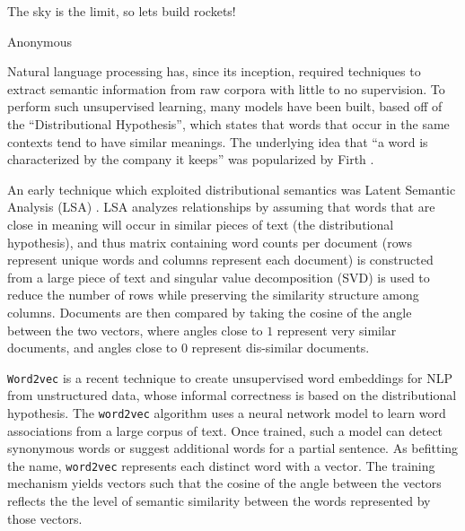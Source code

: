 \documentclass[11pt]{book}
\newcommand{\citep}[1]{\cite{#1}}
\begin{document}
\epigraph{The sky is the limit, so lets build rockets!}{Anonymous}


Natural language processing has, since its inception, required
techniques to extract semantic information from raw corpora with little to no
supervision. To perform such unsupervised learning, many models
have been built, based off of the ``Distributional Hypothesis'', which states
that words that occur in the same contexts tend to have similar meanings.
The
underlying idea that ``a word is characterized by the company it keeps'' was
popularized by Firth \citep{firth1957synopsis}.

An early technique which exploited distributional semantics was Latent Semantic
Analysis (LSA) \cite{landauer1998introduction}. LSA analyzes relationships by
assuming that words that are close in meaning will occur in similar pieces of
text (the distributional hypothesis), and thus matrix containing word counts
per document (rows represent unique words and columns represent each document)
is constructed from a large piece of text and  singular value decomposition
(SVD) is used to reduce the number of rows while preserving the similarity
structure among columns. Documents are then compared by taking the cosine of
the angle between the two vectors, where angles close to $1$ represent very
similar documents, and angles close to $0$ represent dis-similar documents.

\texttt{Word2vec} is a recent technique to create unsupervised word embeddings
for NLP from unstructured data, whose informal correctness is based on the
distributional hypothesis. 
The \texttt{word2vec} algorithm uses a neural network 
model to learn word associations from a large corpus of text. Once trained,
such a model can detect synonymous words or suggest additional words for a
partial sentence.  As befitting the name, \texttt{word2vec} represents each
distinct word with a vector. 
The training mechanism yields vectors such that
the cosine of the angle between the vectors reflects the the level of semantic
similarity between the words represented by those vectors.
\end{document}
